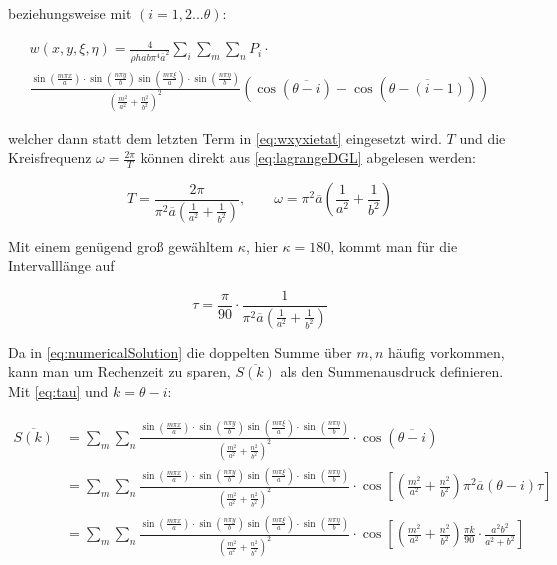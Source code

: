 beziehungsweise mit $(i=1,2 ... \theta)$: 

\begin{multline}
 	w(x,y,\xi, \eta) = \frac{4}{\rho h a b \pi^4 \overline{a}^2} \sum_i \sum_m \sum_n P_{i} \cdot \\ \frac{\sin\left(\frac{m \pi x}{a}\right) \cdot \sin\left(\frac{n \pi y}{b}\right) \sin\left(\frac{m \pi \xi}{a}\right) \cdot \sin\left(\frac{n \pi \eta}{b}\right)	}{ \left( \frac{m^2}{a^2} + \frac{n^2}{b^2} \right)^2} \left( \cos(\overline{\theta - i}) - \cos(\overline{\theta - (i-1)}) \right) 	
\label{eq:numericalSolution}
\end{multline}

welcher dann statt dem letzten Term in \ref{eq:wxyxietat} eingesetzt wird. $T$ und die Kreisfrequenz $\omega = \frac{2 \pi}{T}$ können direkt aus \ref{eq:lagrangeDGL} abgelesen werden: 

\begin{equation}
	T = \frac{2 \pi}{\pi^2 \overline{a} \left( \frac{1}{a^2} + \frac{1}{b^2} \right) }, \qquad \omega=\pi^2 \overline{a} \left( \frac{1}{a^2}+\frac{1}{b^2} \right)
\end{equation}

Mit einem genügend groß gewähltem $\kappa$, hier $\kappa=180$, kommt man für die Intervalllänge auf

\begin{equation}
	\tau = \frac{\pi}{90} \cdot \frac{1}{\pi^2 \overline{a} \left( \frac{1}{a^2} + \frac{1}{b^2} \right) }
	\label{eq:tau}
\end{equation}


Da in \ref{eq:numericalSolution} die doppelten Summe über $m,n$ häufig vorkommen, kann man um Rechenzeit zu sparen, $\overline{S(k)}$ als den Summenausdruck definieren. Mit \ref{eq:tau} und $k=\theta - i$:

\begin{equation}
\begin{split}
\overline{S(k)} & = \sum_m \sum_n \frac{\sin\left(\frac{m \pi x}{a}\right) \cdot \sin\left(\frac{n \pi y}{b}\right) \sin\left(\frac{m \pi \xi}{a}\right) \cdot \sin\left(\frac{n \pi \eta}{b}\right)	}{ \left( \frac{m^2}{a^2} + \frac{n^2}{b^2} \right)^2} \cdot \cos\left(\overline{\theta - i}\right) \\ 
& = \sum_m \sum_n \frac{\sin\left(\frac{m \pi x}{a}\right) \cdot \sin\left(\frac{n \pi y}{b}\right) \sin\left(\frac{m \pi \xi}{a}\right) \cdot \sin\left(\frac{n \pi \eta}{b}\right)	}{ \left( \frac{m^2}{a^2} + \frac{n^2}{b^2} \right)^2} \cdot \cos \left[ \left( \frac{m^2}{a^2}+\frac{n^2}{b^2} \right) \pi^2\overline{a}(\theta - i)\tau\right] \\
&= \sum_m \sum_n \frac{\sin\left(\frac{m \pi x}{a}\right) \cdot \sin\left(\frac{n \pi y}{b}\right) \sin\left(\frac{m \pi \xi}{a}\right) \cdot \sin\left(\frac{n \pi \eta}{b}\right)	}{ \left( \frac{m^2}{a^2} + \frac{n^2}{b^2} \right)^2} \cdot \cos \left[ \left( \frac{m^2}{a^2}+\frac{n^2}{b^2} \right) \frac{\pi k}{90} \cdot \frac{a^{2}b^{2}}{a^{2}+b^{2}} \right] \\
\end{split}
\end{equation}


